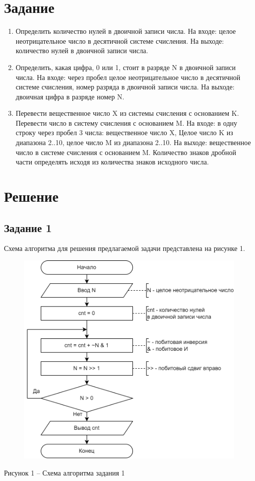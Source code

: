 \documentclass[a4paper,14pt]{extarticle}
\begin{document}
  \section*{Задание}
  \begin{enumerate}
    \item Определить количество нулей в двоичной записи числа. На входе: целое неотрицательное число в десятичной системе счисления. На выходе: количество нулей в двоичной записи числа.
    
    \item Определить, какая цифра, 0 или 1, стоит в разряде N в двоичной записи числа. На входе: через пробел целое неотрицательное число в десятичной системе счисления, номер разряда в двоичной записи числа. На выходе: двоичная цифра в разряде номер N.
    
    \item Перевести вещественное число X из системы счисления с основанием K. Перевести число в систему счисления с основанием M. На входе: в одну строку через пробел 3 числа: вещественное число X, Целое число K из диапазона 2..10, целое число M из диапазона 2..10. На выходе: вещественное число в системе счисления с основанием M. Количество знаков дробной части определять исходя из количества знаков исходного числа.
  \end{enumerate}

  \newpage
  \section*{Решение}
  \subsection*{Задание 1}
  Схема алгоритма для решения предлагаемой задачи представлена на рисунке 1.

  \begin{figure}[h]
    \centering
    \includegraphics[width=0.68\linewidth]{schemes/s-1}
  \end{figure}
  \begin{center}
    Рисунок 1 – Схема алгоритма задания 1
  \end{center}
\end{document}

